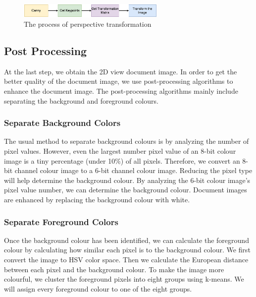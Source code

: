 \documentclass[10pt, conference, compsocconf]{IEEEtran}
\begin{document}
\begin{figure}[!h]
	\centering
	\includegraphics[width=2.8in]{./Assets/123.jpg}
	\caption{The process of perspective transformation}
\end{figure}

\subsection{Post Processing}

\label{post-process}

At the last step, we obtain the 2D view document image. In order to get the better quality of the document image, we use post-processing algorithms to enhance the document image. The post-processing algorithms mainly include separating the background and foreground colours.

\subsubsection{Separate Background Colors}

The usual method to separate background colours is by analyzing the number of pixel values.
However, even the largest number pixel value of an 8-bit colour image is a tiny percentage (under 10\%) of all pixels.
Therefore, we convert an 8-bit channel colour image to a 6-bit channel colour image.
Reducing the pixel type will help determine the background colour.
By analyzing the 6-bit colour image's pixel value number, we can determine the background colour. Document images are enhanced by replacing the background colour with white.

\subsubsection{Separate Foreground Colors}

\label{separate-foreground-colors}
Once the background colour has been identified, we can calculate the foreground colour by calculating how similar each pixel is to the background colour.
We first convert the image to HSV color space.
Then we calculate the European distance between each pixel and the background colour.
To make the image more colourful, we cluster the foreground pixels into eight groups using k-means\cite{hartigan1979algorithm}. 
We will assign every foreground colour to one of the eight groups. 
\end{document}
